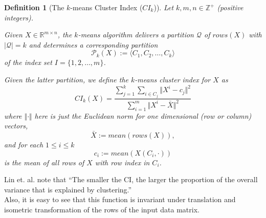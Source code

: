 \documentclass{article}
\newtheorem{definition}[theorem]{Definition}
\begin{document}
\begin{definition}[The $k$-means Cluster Index ($CI_{k}$)]
\label{CI}
Let $k, m, n\in \mathbb{Z}^{+}$ (positive integers).

Given $X \in \mathbb{R}^{m \times n}$, the $k$-means algorithm delivers a partition $\mathscr{Q}$ of $rows(X)$ with $\vert \mathscr{Q} \vert = k$ and determines a corresponding partition
$$\mathscr{P}_{k}(X) := \langle C_1, C_2, \ldots, C_k \rangle$$ 
of the \emph{index set} $I = \{1, 2, \ldots, m\}$.

 Given the latter partition, we define the \emph{$k$-means cluster index} for $X$ as
$$CI_{k}(X) = \frac{\sum_{j = 1}^{k} \sum_{i \in C_{j}} \Vert X^{i} - c_{j}\Vert^{2}}{\sum_{i = 1}^{m} \Vert X^{i} - \bar{X}\Vert^{2}}$$
where
$\Vert \cdot \Vert$ here is just the Euclidean norm for one dimensional (row or column) vectors,
$$\bar{X}:= mean(rows(X)),$$
 and for each $1\leq i \leq k$
$$c_i := mean(X(C_{i}, \cdot))$$
is the mean of all rows of $X$ with row index in $C_i$.

\end{definition}

\indent Lin et. al. note that ``The smaller the CI, the larger the proportion of the overall variance that is explained by clustering.''  \\
\indent Also, it is easy to see that this function is invariant under translation and isometric transformation of the rows of the input data matrix.
\end{document}
